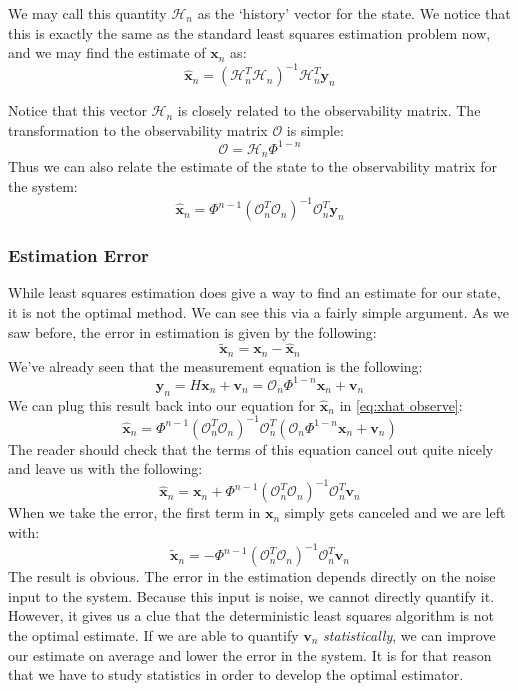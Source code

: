 We may call this quantity $\mathcal{H}_n$ as the `history' vector for the state. We notice that this is exactly the same as the standard least squares estimation problem now, and we may find the estimate of $\bm{x}_n$ as:
\begin{equation}\label{eq:least squares xhat}
\bm{\hat{x}}_n=\left(\mathcal{H}_n^T\mathcal{H}_n\right)^{-1}\mathcal{H}_n^T\bm{y}_n
\end{equation}

Notice that this vector $\mathcal{H}_n$ is closely related to the observability matrix. The transformation to the observability matrix $\mathcal{O}$ is simple:
$$\mathcal{O}=\mathcal{H}_n\Phi^{1-n}$$
Thus we can also relate the estimate of the state to the observability matrix for the system:
\begin{equation}\label{eq:xhat observe}
\bm{\hat{x}}_n=\Phi^{n-1}\left({\mathcal{O}}_n^T\mathcal{O}_n\right)^{-1}\mathcal{O}_n^T\bm{y}_n
\end{equation}

\subsubsection{Estimation Error}
While least squares estimation does give a way to find an estimate for our state, it is not the optimal method. We can see this via a fairly simple argument. As we saw before, the error in estimation is given by the following:
$$\bm{\tilde{x}}_n=\bm{x}_n-\bm{\hat{x}}_n$$
We've already seen that the measurement equation is the following:
$$\bm{y}_n=H\bm{x}_n+\bm{v}_n=\mathcal{O}_n\Phi^{1-n}\bm{x}_n+\bm{v}_n$$
We can plug this result back into our equation for $\bm{\hat{x}}_n$ in \autoref{eq:xhat observe}:
\begin{equation}
\bm{\hat{x}}_n=\Phi^{n-1}\left({\mathcal{O}}_n^T\mathcal{O}_n\right)^{-1}\mathcal{O}_n^T(\mathcal{O}_n\Phi^{1-n}\bm{x}_n+\bm{v}_n)
\end{equation}
The reader should check that the terms of this equation cancel out quite nicely and leave us with the following:
\begin{equation}
\bm{\hat{x}}_n=\bm{x}_n+\Phi^{n-1}\left({\mathcal{O}}_n^T\mathcal{O}_n\right)^{-1}\mathcal{O}^T_n\bm{v}_n
\end{equation}
When we take the error, the first term in $\bm{x}_n$ simply gets canceled and we are left with:
$$\bm{\tilde{x}}_n=-\Phi^{n-1}\left({\mathcal{O}}_n^T\mathcal{O}_n\right)^{-1}\mathcal{O}^T_n\bm{v}_n$$
The result is obvious. The error in the estimation depends directly on the noise input to the system. Because this input is noise, we cannot directly quantify it. However, it gives us a clue that the deterministic least squares algorithm is not the optimal estimate. If we are able to quantify $\bm{v}_n$ \textit{statistically}, we can improve our estimate on average and lower the error in the system. It is for that reason that we have to study statistics in order to develop the optimal estimator.

